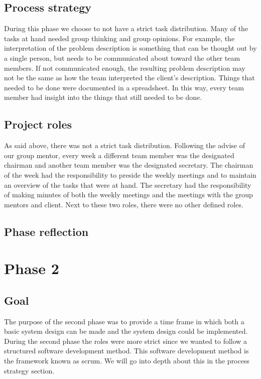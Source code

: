 \subsection{Process strategy}
During this phase we choose to not have a strict task distribution.
Many of the tasks at hand needed group thinking and group opinions.
For example, the interpretation of the problem description is something that can be thought out by a single person, but needs to be communicated about toward the other team members.
If not communicated enough, the resulting problem description may not be the same as how the team interpreted the client's description.
Things that needed to be done were documented in a spreadsheet.
In this way, every team member had insight into the things that still needed to be done.

\subsection{Project roles}
As said above, there was not a strict task distribution.
Following the advise of our group mentor, every week a different team member was the designated chairman and another team member was the designated secretary.
The chairman of the week had the responsibility to preside the weekly meetings and to maintain an overview of the tasks that were at hand.
The secretary had the responsibility of making minutes of both the weekly meetings and the meetings with the group mentors and client.
Next to these two roles, there were no other defined roles.

\subsection{Phase reflection}

\section{Phase 2}
\subsection{Goal}
The purpose of the second phase was to provide a time frame in which both a basic system design can be made and the system design could be implemented.
During the second phase the roles were more strict since we wanted to follow a structured software development method.
This software development method is the framework known as scrum.
We will go into depth about this in the process strategy section.

